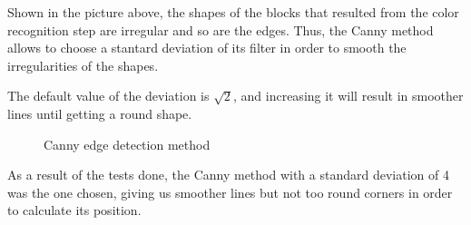 Shown in the picture above, the shapes of the blocks that resulted from the color recognition step are irregular and so are the edges. Thus, the Canny method allows to choose a stantard deviation of its filter in order to smooth the irregularities of the shapes.\par 



The default value of the deviation is $\sqrt{2}$, and increasing it will result in smoother lines until getting a round shape.

\begin{figure}[H]
  \hfill
  \hfill
  \hfill
  \hfill
  \hfill

  \caption{Canny edge detection method}

\end{figure}

As a result of the tests done, the Canny method with a standard deviation of 4 was the one chosen, giving us smoother lines but not too round corners in order to calculate its position.



 
